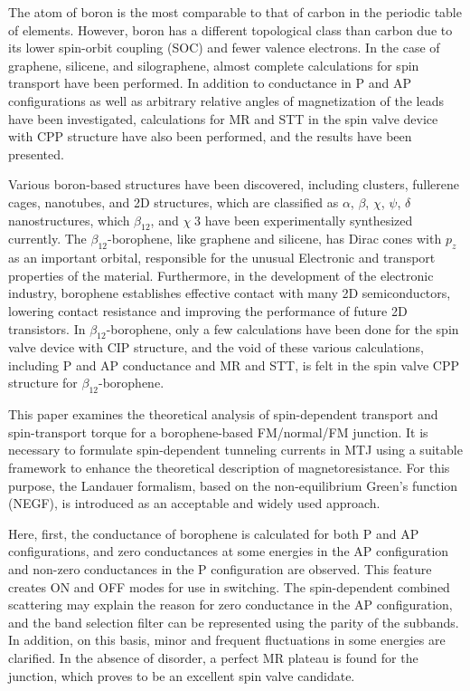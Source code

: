 \documentclass[twoside,twocolumn,9pt]{article}
\begin{document}
The atom of boron is the most comparable to that of carbon in the periodic table of elements. However, boron has a different topological class than carbon due to its lower spin-orbit coupling (SOC) and fewer valence electrons. In the case of graphene, silicene, and silographene, almost complete calculations for spin transport have been performed\cite{maher2022spin,chen2010electronic,qin2015origin,ding2014spin,zhou2015symmetry,schneider2014density}. In addition to conductance in P and AP configurations as well as arbitrary relative angles of magnetization of the leads have been investigated, calculations for MR and STT in the spin valve device with CPP structure have also been performed, and the results have been presented.

Various boron-based structures have been discovered, including clusters, fullerene cages, nanotubes, and 2D structures\cite{wu2012two,penev2012polymorphism,zhai2014observation,ciuparu2004synthesis}, which are classified as $\alpha$, $\beta$, $\chi$, $\psi$, $\delta$ nanostructures, which $\beta_{12}$, and $\chi\;3$ have been experimentally synthesized currently\cite{mannix2015synthesis,feng2016experimental}. The $\beta_{12}$-borophene, like graphene and silicene, has Dirac cones with $p_z$ as an important orbital, responsible for the unusual Electronic and transport properties of the material\cite{tang2007novel,ullah2020bat,jafari2020electronic}. Furthermore, in the development of the electronic industry, borophene establishes effective contact with many 2D semiconductors, lowering contact resistance and improving the performance of future 2D transistors\cite{yang2017interfacial}.
In $\beta_{12}$-borophene, only a few calculations have been done for the spin valve device with CIP structure, and the void of these various calculations, including P and AP conductance and MR and STT, is felt in the spin valve CPP structure for $\beta_{12}$-borophene\cite{yang2017interfacial}.

This paper examines the theoretical analysis of spin-dependent transport and spin-transport torque for a borophene-based FM/normal/FM junction. It is necessary to formulate spin-dependent tunneling currents in MTJ using a suitable framework to enhance the theoretical description of magnetoresistance. For this purpose, the Landauer formalism\cite{ezawa2017triplet}, based on the non-equilibrium Green's function (NEGF)\cite{slonczewski1989j}, is introduced as an acceptable and widely used approach.

Here, first, the conductance of borophene is calculated for both P and AP configurations, and zero conductances at some energies in the AP configuration and non-zero conductances in the P configuration are observed. This feature creates ON and OFF modes for use in switching. The spin-dependent combined scattering may explain the reason for zero conductance in the AP configuration, and the band selection filter can be represented using the parity of the subbands. In addition, on this basis, minor and frequent fluctuations in some energies are clarified. In the absence of disorder, a perfect MR plateau is found for the junction, which proves to be an excellent spin valve candidate.
\end{document}

